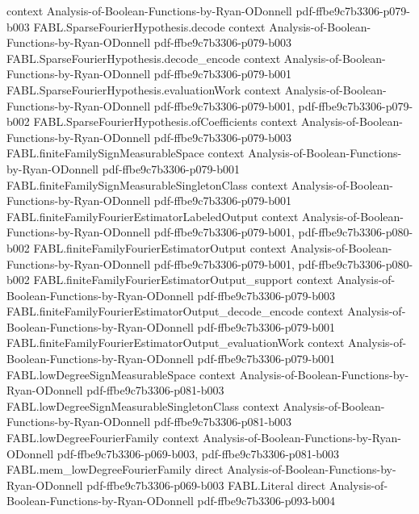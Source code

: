 \begin{theorem}
  {context}
  {Analysis-of-Boolean-Functions-by-Ryan-ODonnell}
  {pdf-ffbe9c7b3306-p079-b003}
\proofstep
  {FABL.SparseFourierHypothesis.decode}
  {context}
  {Analysis-of-Boolean-Functions-by-Ryan-ODonnell}
  {pdf-ffbe9c7b3306-p079-b003}
\proofstep
  {FABL.SparseFourierHypothesis.decode_encode}
  {context}
  {Analysis-of-Boolean-Functions-by-Ryan-ODonnell}
  {pdf-ffbe9c7b3306-p079-b001}
\proofstep
  {FABL.SparseFourierHypothesis.evaluationWork}
  {context}
  {Analysis-of-Boolean-Functions-by-Ryan-ODonnell}
  {pdf-ffbe9c7b3306-p079-b001,
    pdf-ffbe9c7b3306-p079-b002}
\proofstep
  {FABL.SparseFourierHypothesis.ofCoefficients}
  {context}
  {Analysis-of-Boolean-Functions-by-Ryan-ODonnell}
  {pdf-ffbe9c7b3306-p079-b003}
\proofstep
  {FABL.finiteFamilySignMeasurableSpace}
  {context}
  {Analysis-of-Boolean-Functions-by-Ryan-ODonnell}
  {pdf-ffbe9c7b3306-p079-b001}
\proofstep
  {FABL.finiteFamilySignMeasurableSingletonClass}
  {context}
  {Analysis-of-Boolean-Functions-by-Ryan-ODonnell}
  {pdf-ffbe9c7b3306-p079-b001}
\proofstep
  {FABL.finiteFamilyFourierEstimatorLabeledOutput}
  {context}
  {Analysis-of-Boolean-Functions-by-Ryan-ODonnell}
  {pdf-ffbe9c7b3306-p079-b001,
    pdf-ffbe9c7b3306-p080-b002}
\proofstep
  {FABL.finiteFamilyFourierEstimatorOutput}
  {context}
  {Analysis-of-Boolean-Functions-by-Ryan-ODonnell}
  {pdf-ffbe9c7b3306-p079-b001,
    pdf-ffbe9c7b3306-p080-b002}
\proofstep
  {FABL.finiteFamilyFourierEstimatorOutput_support}
  {context}
  {Analysis-of-Boolean-Functions-by-Ryan-ODonnell}
  {pdf-ffbe9c7b3306-p079-b003}
\proofstep
  {FABL.finiteFamilyFourierEstimatorOutput_decode_encode}
  {context}
  {Analysis-of-Boolean-Functions-by-Ryan-ODonnell}
  {pdf-ffbe9c7b3306-p079-b001}
\proofstep
  {FABL.finiteFamilyFourierEstimatorOutput_evaluationWork}
  {context}
  {Analysis-of-Boolean-Functions-by-Ryan-ODonnell}
  {pdf-ffbe9c7b3306-p079-b001}
\proofstep
  {FABL.lowDegreeSignMeasurableSpace}
  {context}
  {Analysis-of-Boolean-Functions-by-Ryan-ODonnell}
  {pdf-ffbe9c7b3306-p081-b003}
\proofstep
  {FABL.lowDegreeSignMeasurableSingletonClass}
  {context}
  {Analysis-of-Boolean-Functions-by-Ryan-ODonnell}
  {pdf-ffbe9c7b3306-p081-b003}
\proofstep
  {FABL.lowDegreeFourierFamily}
  {context}
  {Analysis-of-Boolean-Functions-by-Ryan-ODonnell}
  {pdf-ffbe9c7b3306-p069-b003,
    pdf-ffbe9c7b3306-p081-b003}
\proofstep
  {FABL.mem_lowDegreeFourierFamily}
  {direct}
  {Analysis-of-Boolean-Functions-by-Ryan-ODonnell}
  {pdf-ffbe9c7b3306-p069-b003}
\proofstep
  {FABL.Literal}
  {direct}
  {Analysis-of-Boolean-Functions-by-Ryan-ODonnell}
  {pdf-ffbe9c7b3306-p093-b004}

\end{theorem}
